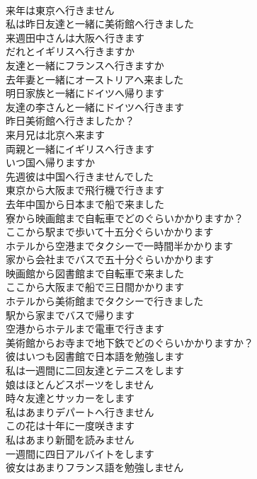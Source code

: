 \documentclass[8pt]{extreport}
\begin{document}
\begin{CJK}{UTF8}{min}
\\	来年は東京へ行きません	
\\	私は昨日友達と一緒に美術館へ行きました	
\\	来週田中さんは大阪へ行きます	
\\	だれとイギリスへ行きますか	
\\	友達と一緒にフランスへ行きますか	
\\	去年妻と一緒にオーストリアへ来ました	
\\	明日家族と一緒にドイツへ帰ります	
\\	友達の李さんと一緒にドイツへ行きます	
\\	昨日美術館へ行きましたか？	
\\	来月兄は北京へ来ます	
\\	両親と一緒にイギリスへ行きます	
\\	いつ国へ帰りますか	
\\	先週彼は中国へ行きませんでした	
\\	東京から大阪まで飛行機で行きます	
\\	去年中国から日本まで船で来ました	
\\	寮から映画館まで自転車でどのぐらいかかりますか？	
\\	ここから駅まで歩いて十五分ぐらいかかります	
\\	ホテルから空港までタクシーで一時間半かかります	
\\	家から会社までバスで五十分ぐらいかかります	
\\	映画館から図書館まで自転車で来ました	
\\	ここから大阪まで船で三日間かかります	
\\	ホテルから美術館までタクシーで行きました	
\\	駅から家までバスで帰ります	
\\	空港からホテルまで電車で行きます	
\\	美術館からお寺まで地下鉄でどのぐらいかかりますか？	
\\	彼はいつも図書館で日本語を勉強します	
\\	私は一週間に二回友達とテニスをします	
\\	娘はほとんどスポーツをしません	
\\	時々友達とサッカーをします	
\\	私はあまりデパートへ行きません	
\\	この花は十年に一度咲きます	
\\	私はあまり新聞を読みません	
\\	一週間に四日アルバイトをします	
\\	彼女はあまりフランス語を勉強しません	

\end{CJK}
\end{document}
